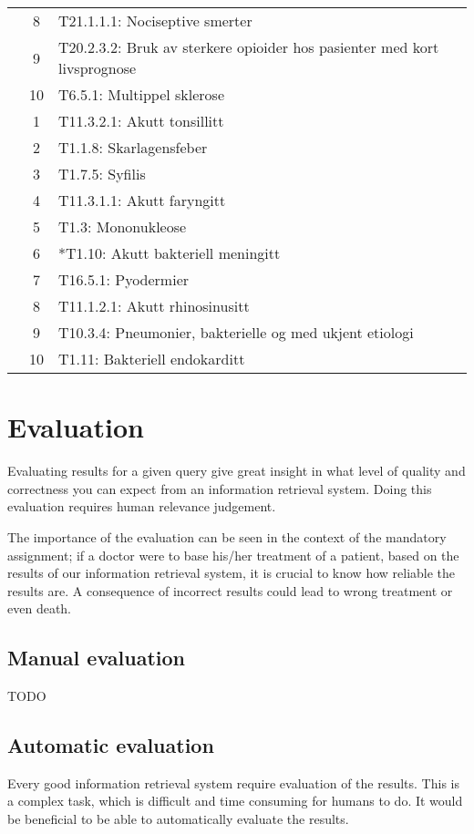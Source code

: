 \documentclass[a4paper, 11pt]{article}
\begin{document}
\begin{table}[htbp]
\begin{tabularx}{\textwidth}{c c X}
	 & 8 & T21.1.1.1: Nociseptive smerter \\
	 & 9 & T20.2.3.2: Bruk av sterkere opioider hos pasienter med kort livsprognose \\
	 & 10 & T6.5.1: Multippel sklerose \\
	\addlinespace
	8 & 1 & T11.3.2.1: Akutt tonsillitt \\
	 & 2 & T1.1.8: Skarlagensfeber \\
	 & 3 & T1.7.5: Syfilis \\
	 & 4 & T11.3.1.1: Akutt faryngitt \\
	 & 5 & T1.3: Mononukleose \\
	 & 6 & *T1.10: Akutt bakteriell meningitt \\
	 & 7 & T16.5.1: Pyodermier \\
	 & 8 & T11.1.2.1: Akutt rhinosinusitt \\
	 & 9 & T10.3.4: Pneumonier, bakterielle og med ukjent etiologi \\
	 & 10 & T1.11: Bakteriell endokarditt \\
	\bottomrule
\end{tabularx}
\end{table}


\section{Evaluation}
\label{sec:evaluation}
Evaluating results for a given query give great insight in what level of quality and correctness you can expect from an information retrieval system. Doing this evaluation requires human relevance judgement.

The importance of the evaluation can be seen in the context of the mandatory assignment; if a doctor were to base his/her treatment of a patient, based on the results of our information retrieval system, it is crucial to know how reliable the results are. A consequence of incorrect results could lead to wrong treatment or even death.

\subsection{Manual evaluation}
TODO

\subsection{Automatic evaluation}
Every good information retrieval system require evaluation of the results. This is a complex task, which is difficult and time consuming for humans to do. It would be beneficial to be able to automatically evaluate the results.
\end{document}

